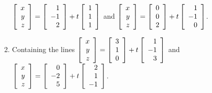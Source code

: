 \begin{multicols}{2}
\begin{ex}
\begin{enumerate}[label={\alph*.}]
$\left[
\begin{array}{r}
x\\
y\\
z
\end{array}
\right]
=
\left[
\begin{array}{r}
1\\
-1\\
2
\end{array}
\right]
+t
\left[
\begin{array}{r}
1\\
1\\
1
\end{array}
\right] 
$ and
\newline $\left[
\begin{array}{r}
x\\
y\\
z
\end{array}
\right]
=
\left[
\begin{array}{r}
0\\
0\\
2
\end{array}
\right]
+t
\left[
\begin{array}{r}
1\\
-1\\
0
\end{array}
\right]$.

\item Containing the lines $\left[
\begin{array}{r}
x\\
y\\
z
\end{array}
\right]
=
\left[
\begin{array}{r}
3\\
1\\
0
\end{array}
\right]
+t
\left[
\begin{array}{r}
1\\
-1\\
3
\end{array}
\right] 
$ and
$\left[
\begin{array}{r}
x\\
y\\
z
\end{array}
\right]
=
\left[
\begin{array}{r}
0\\
-2\\
5
\end{array}
\right]
+t
\left[
\begin{array}{r}
2\\
1\\
-1
\end{array}
\right]$.


\end{enumerate}
\end{ex}
\end{multicols}
